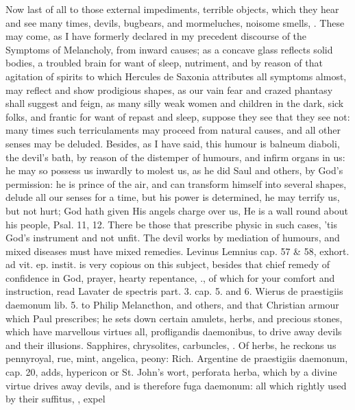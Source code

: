 {Now last of all to those external impediments, terrible objects, which
they hear and see many times, devils, bugbears, and mormeluches,
noisome smells, \etc{}. These may come, as I have formerly declared in my
precedent discourse of the Symptoms of Melancholy, from inward causes;
as a concave glass reflects solid bodies, a troubled brain for want of
sleep, nutriment, and by reason of that agitation of spirits to which
Hercules de Saxonia attributes all symptoms almost, may reflect and
show prodigious shapes, as our vain fear and crazed phantasy shall
suggest and feign, as many silly weak women and children in the dark,
sick folks, and frantic for want of repast and sleep, suppose they see
that they see not: many times such terriculaments may proceed from
natural causes, and all other senses may be deluded. Besides, as I have
said, this humour is balneum diaboli, the devil's bath, by reason of
the distemper of humours, and infirm organs in us: he may so possess us
inwardly to molest us, as he did Saul and others, by God's permission:
he is prince of the air, and can transform himself into several shapes,
delude all our senses for a time, but his power is determined, he may
terrify us, but not hurt; God hath given His angels charge over us, He
is a wall round about his people, Psal.  11, 12. There be those
that prescribe physic in such cases, 'tis God's instrument and not
unfit. The devil works by mediation of humours, and mixed diseases must
have mixed remedies. Levinus Lemnius cap. 57 \& 58, exhort. \textlatin{ad vit. ep.
instit.} is very copious on this subject, besides that chief remedy of
confidence in God, prayer, hearty repentance, \etc{}., of which for your
comfort and instruction, read Lavater \textlatin{de spectris part. 3. cap. 5. and
6. Wierus de praestigiis daemonum lib. 5.} to Philip Melancthon, and
others, and that Christian armour which Paul prescribes; he sets down
certain amulets, herbs, and precious stones, which have marvellous
virtues all, profligandis daemonibus, to drive away devils and their
illusions. Sapphires, chrysolites, carbuncles, \etc{}.  Of herbs, he reckons us pennyroyal,
rue, mint, angelica, peony: Rich. Argentine de praestigiis daemonum,
cap. 20, adds, hypericon or St. John's wort, perforata herba, which by
a divine virtue drives away devils, and is therefore fuga daemonum: all
which rightly used by their suffitus, , expel
}
